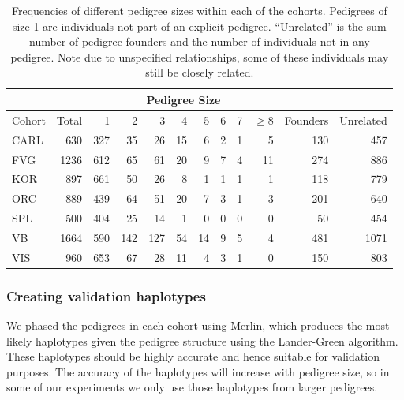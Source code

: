 \begin{table}[h]
        \vspace{20pt}        
  \begin{center}
  \begin{tabular}{|l|r|rrrrrrrr|r|r|}
    \hline
    &&\multicolumn{8}{c|}{Pedigree Size}&&\\
    \hline
    Cohort & Total   & 1     & 2     & 3     & 4     & 5     & 6     &
    7     &  $\geq$8  & Founders & Unrelated      \\
    \hline
    CARL          & 630   & 327   & 35    & 26    & 15    & 6     & 2     & 1     & 5  & 130 & 457 \\
    FVG           & 1236  & 612   & 65    & 61    & 20    & 9     & 7    & 4     & 11 & 274  & 886  \\
    KOR       & 897   & 661   & 50    & 26    & 8     & 1     & 1    & 1     & 1  & 118 & 779 \\
    ORC        & 889   & 439   & 64    & 51    & 20    & 7     & 3  & 1     & 3 & 201 &  640 \\
    SPL         & 500   & 404   & 25    & 14    & 1     & 0     & 0     & 0     & 0  & 50 & 454 \\
    VB    & 1664  & 590   & 142   & 127   & 54    & 14    & 9     & 5     & 4  & 481 & 1071\\
    VIS           & 960   & 653   & 67    & 28    & 11    & 4     & 3     & 1     & 0  &150 & 803 \\
    \hline
  \end{tabular}
  \end{center} 
\caption[Summary of pedigrees in our cohorts]{Frequencies of different pedigree sizes within each of the cohorts. Pedigrees of size 1 are individuals not part of an explicit pedigree.  ``Unrelated'' is the sum number of pedigree founders and the number of individuals not in any pedigree.  Note due to unspecified relationships, some of these individuals may still be closely related. \label{tab:cohort_summary}}
\end{table}

\subsubsection{Creating validation haplotypes}

We phased the pedigrees in each cohort using Merlin,  which produces the most likely haplotypes given the pedigree structure using the Lander-Green algorithm. These haplotypes should be highly accurate and hence suitable for validation purposes. The accuracy of the haplotypes will increase with pedigree size, so in some of our experiments we only use those haplotypes from larger pedigrees.

